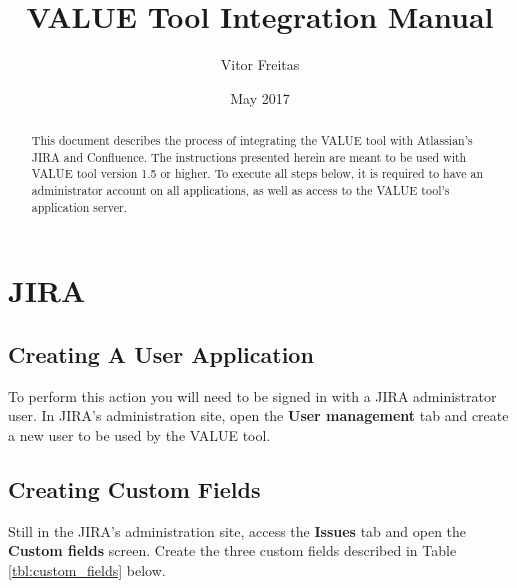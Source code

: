 \documentclass{article}
\title{VALUE Tool Integration Manual}
\author{Vitor Freitas}
\date{May 2017}
\begin{document}
\maketitle

\begin{abstract}
This document describes the process of integrating the VALUE tool with Atlassian's JIRA and Confluence. The instructions presented herein are meant to be used with VALUE tool version 1.5 or higher. To execute all steps below, it is required to have an administrator account on all applications, as well as access to the VALUE tool's application server.
\end{abstract}

\tableofcontents

\section{JIRA}
\label{jira}
\subsection{Creating A User Application}
\label{jira_app_user}

To perform this action you will need to be signed in with a JIRA administrator user. In JIRA's administration site, open the \textbf{User management} tab and create a new user to be used by the VALUE tool.


\subsection{Creating Custom Fields}
\label{jira_custom_fields}
Still in the JIRA's administration site, access the \textbf{Issues} tab and open the \textbf{Custom fields} screen. Create the three custom fields described in Table \ref{tbl:custom_fields} below.
\end{document}
